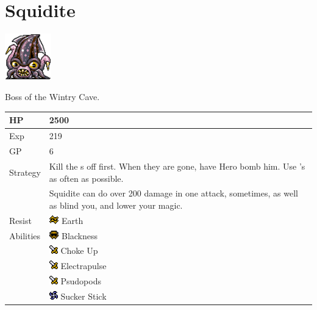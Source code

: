 \section{Squidite}
\label{monster:squidite}

\includegraphics[height=2cm,keepaspectratio]{./resources/monster/squidite}

Boss of the Wintry Cave.

\begin{longtable}{ l p{9cm} }
	HP
	& 2500
\\ \hline
	Exp
	& 219
\\ \hline
	GP
	& 6
\\ \hline
	Strategy
	& Kill the \nameref{monster:sparna}s off first. When they are gone, have Hero bomb him. Use \nameref{char:phoebe}'s \nameref{spell:thunder} as often as possible. \\
	& Squidite can do over 200 damage in one attack, sometimes, as well as blind you, and lower your magic.
\\ \hline
	Resist
	& \includegraphics[height=1em,keepaspectratio]{./resources/effects/earth} Earth
\\ \hline
	Abilities
	& \includegraphics[height=1em,keepaspectratio]{./resources/effects/blind} Blackness \\
	& \includegraphics[height=1em,keepaspectratio]{./resources/effects/damage} Choke Up \\
	& \includegraphics[height=1em,keepaspectratio]{./resources/effects/damage} Electrapulse \\
	& \includegraphics[height=1em,keepaspectratio]{./resources/effects/damage} Psudopods \\
	& \includegraphics[height=1em,keepaspectratio]{./resources/effects/drain} Sucker Stick
\end{longtable}
